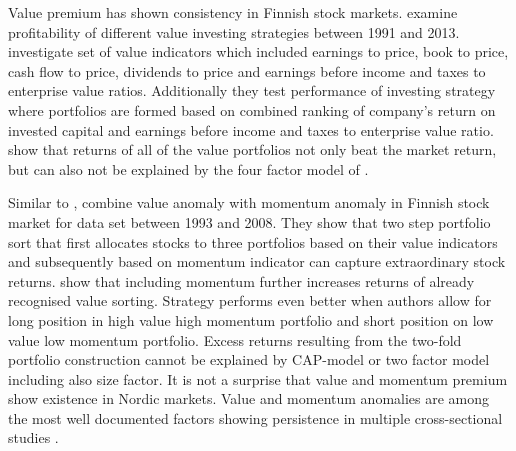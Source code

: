 \documentclass[12pt]{article}
\begin{document}
Value premium has shown consistency in Finnish stock markets. \citet*{Davydov2017MagicFV} examine profitability of different value investing strategies between 1991 and 2013. \citet{Davydov2017MagicFV} investigate set of value indicators which included earnings to price, book to price, cash flow to price, dividends to price and earnings before income and taxes to enterprise value ratios. Additionally they test performance of investing strategy where portfolios are formed based on combined ranking of company's return on invested capital and earnings before income and taxes to enterprise value ratio. \citet{Davydov2017MagicFV} show that returns of all of the value portfolios not only beat the market return, but can also not be explained by the four factor model of \citet{Carhart1997}.  \par

Similar to \citet{grobys}, \citet{leivo2011} combine value anomaly with momentum anomaly in Finnish stock market for data set between 1993 and 2008. They show that two step portfolio sort that first allocates stocks to three portfolios based on their value indicators and subsequently based on momentum indicator can capture extraordinary stock returns.\citeauthor{leivo2011} show that including momentum further increases returns of already recognised value sorting. Strategy performs even better when authors allow for long position in high value high momentum portfolio and short position on low value low momentum portfolio. Excess returns resulting from the two-fold portfolio construction cannot be explained by CAP-model or two factor model including also size factor. It is not a surprise that value and momentum premium show existence in Nordic markets. Value and momentum anomalies are among the most well documented factors showing persistence in multiple cross-sectional studies \citep[e.g.][]{guetal, Lewellen2015, Drobetz, TOBEK2021100588}. \par
\end{document}
